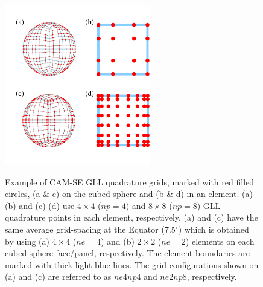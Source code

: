 \documentclass[twocol]{ametsoc}
\begin{document}
\begin{figure}[t]
\begin{center}
\noindent\includegraphics[width=15pc,angle=0]{figs/quadrature-fig/gll.pdf}\\
\end{center}
\caption{Example of CAM-SE GLL quadrature grids, marked with red filled circles, (a \& c) on the cubed-sphere and (b \& d) in an element. (a)-(b) and (c)-(d) use $4\times 4$ ($np=4$) and $8\times 8$ ($np=8$) GLL quadrature points in each element, respectively. (a) and (c) have the same average grid-spacing at the Equator (7.5$^\circ$) which is obtained by using (a) $4\times 4$ ($ne=4$) and (b) $2\times 2$ ($ne=2$) elements on each cubed-sphere face/panel, respectively. The element boundaries are marked with thick light blue lines. The grid configurations shown on (a) and (c) are referred to as $ne4np4$ and $ne2np8$, respectively.}
\label{fig:gll-grids}
\end{figure}
\end{document}
